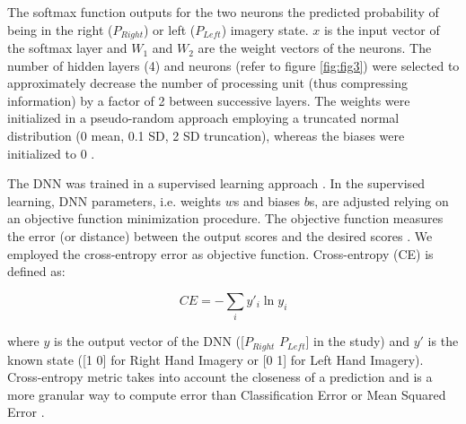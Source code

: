 \documentclass[12pt]{iopart}
\begin{document}
The softmax function outputs for the two neurons the predicted probability of being in the right ($P_{Right}$) or left ($P_{Left}$) imagery state. 
$x$ is the input vector of the softmax layer and $W_{1}$ and $W_{2}$ are the weight vectors of the neurons.
The number of hidden layers (4) and neurons (refer to figure \ref{fig:fig3}) were selected to approximately decrease the number of processing unit (thus compressing information) by a factor of 2 between successive layers. 
The weights were initialized in a pseudo-random approach employing a truncated normal distribution (0 mean, 0.1 SD, 2 SD truncation), whereas the biases were initialized to 0 \parencite{sutskever2013importance}.

The DNN was trained in a supervised learning approach \parencite{hastie2009overview}.
In the supervised learning, DNN parameters, i.e. weights $w$s and biases $b$s, are adjusted relying on an objective function minimization procedure. The objective function measures the error (or distance) between the output scores and the desired scores . We employed the cross-entropy error as objective function.
Cross-entropy (CE) is defined as:

\begin{equation}
CE=
-\sum\limits_i y'_{i}\ln y_{i}
\end{equation}

where $y$ is the output vector of the DNN ([$P_{Right}$  $P_{Left}$] in the study) and $y'$ is the known state ([1 0] for Right Hand Imagery or [0 1] for Left Hand Imagery).
 Cross-entropy metric takes into account the closeness of a prediction and is a more granular way to compute error than Classification Error or Mean Squared Error \parencite{murphy2012machine}.
 
\end{document}
